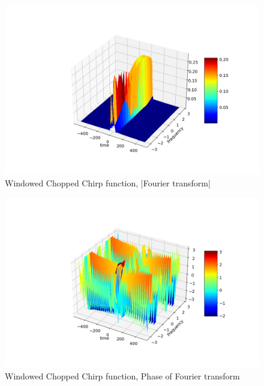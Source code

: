 \documentclass[11pt, a4paper]{article}
\begin{document}
\begin{figure}[!tbh]
\centering
\includegraphics[scale=0.4]{plots/windowed_surfacemag.png}
\caption{Windowed Chopped Chirp function, |Fourier transform|}
\label{fig:16}
\end{figure}

\begin{figure}[!tbh]
\centering
\includegraphics[scale=0.4]{plots/windowed_surfaceangles.png}
\caption{Windowed Chopped Chirp function, Phase of Fourier transform}
\label{fig:17}
\end{figure}

\newpage
\end{document}
